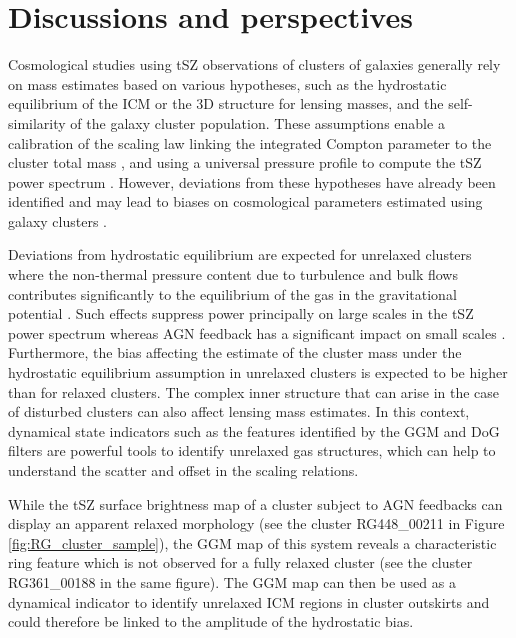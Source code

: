\documentclass[twocolumn,traditabstract]{aa}
\begin{document}
\section{Discussions and perspectives}\label{sec:discussions}
Cosmological studies using tSZ observations of clusters of galaxies generally rely on mass estimates based on various hypotheses, such as the hydrostatic equilibrium of the ICM or the 3D structure for lensing masses, and the self-similarity of the galaxy cluster population. These assumptions enable a calibration of the scaling law linking the integrated Compton parameter to the cluster total mass \citep[see, e.g,][]{Arnaud2007,Arnaud2010,Planck2013V}, and using a universal pressure profile to compute the tSZ power spectrum \citep[e.g.][]{Komatsu2002}. However, deviations from these hypotheses have already been identified and may lead to biases on cosmological parameters estimated using galaxy clusters \citep[see, e.g.][]{Ichikawa2013,McDonald2014,Planck2014XX,Planck2015XXIV,Planck2016XXII}.

Deviations from hydrostatic equilibrium are expected for unrelaxed clusters where the non-thermal pressure content due to turbulence and bulk flows contributes significantly to the equilibrium of the gas in the gravitational potential \citep[e.g.][]{Siegel2016}. Such effects suppress power principally on large scales in the tSZ power spectrum whereas AGN feedback has a significant impact on small scales \citep[e.g.][]{Shaw2010}. Furthermore, the bias affecting the estimate of the cluster mass under the hydrostatic equilibrium assumption in unrelaxed clusters is expected to be higher than for relaxed clusters. The complex inner structure that can arise in the case of disturbed clusters can also affect lensing mass estimates. In this context, dynamical state indicators such as the features identified by the GGM and DoG filters are powerful tools to identify unrelaxed gas structures, which can help to understand the scatter and offset in the scaling relations.

While the tSZ surface brightness map of a cluster subject to AGN feedbacks can display an apparent relaxed morphology (see the cluster RG448\_00211 in Figure \ref{fig:RG_cluster_sample}), the GGM map of this system reveals a characteristic ring feature which is not observed for a fully relaxed cluster (see the cluster RG361\_00188 in the same figure). The GGM map can then be used as a dynamical indicator to identify unrelaxed ICM regions in cluster outskirts and could therefore be linked to the amplitude of the hydrostatic bias.
\end{document}
